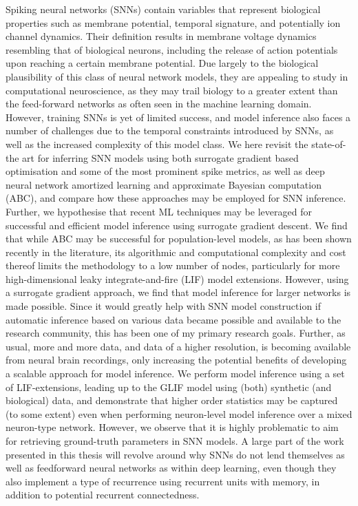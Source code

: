 \documentclass[mphil,deptreport,ai]{infthesis} %
\begin{document}
Spiking neural networks (SNNs) contain variables that represent biological properties such as membrane potential, temporal signature, and potentially ion channel dynamics. Their definition results in membrane voltage dynamics resembling that of biological neurons, including the release of action potentials upon reaching a certain membrane potential.
Due largely to the biological plausibility of this class of neural network models, they are appealing to study in computational neuroscience, as they may trail biology to a greater extent than the feed-forward networks as often seen in the machine learning domain.
However, training SNNs is yet of limited success, and model inference also faces a number of challenges due to the temporal constraints introduced by SNNs, as well as the increased complexity of this model class.
We here revisit the state-of-the art for inferring SNN models using both surrogate gradient based optimisation and some of the most prominent spike metrics, as well as deep neural network amortized learning and approximate Bayesian computation (ABC), and compare how these approaches may be employed for SNN inference. Further, we hypothesise that recent ML techniques may be leveraged for successful and efficient model inference using surrogate gradient descent.
We find that while ABC may be successful for population-level models, as has been shown recently in the literature, its algorithmic and computational complexity and cost thereof limits the methodology to a low number of nodes, particularly for more high-dimensional leaky integrate-and-fire (LIF) model extensions.
However, using a surrogate gradient approach, we find that model inference for larger networks is made possible. 
Since it would greatly help with SNN model construction if automatic inference based on various data became possible and available to the research community, this has been one of my primary research goals.
Further, as usual, more and more data, and data of a higher resolution, is becoming available from neural brain recordings, only increasing the potential benefits of developing a scalable approach for model inference.
We perform model inference using a set of LIF-extensions, leading up to the GLIF model using (both) synthetic (and biological) data, and demonstrate that higher order statistics may be captured (to some extent) even when performing neuron-level model inference over a mixed neuron-type network.
However, we observe that it is highly problematic to aim for retrieving ground-truth parameters in SNN models. A large part of the work presented in this thesis will revolve around why SNNs do not lend themselves as well as feedforward neural networks as within deep learning, even though they also implement a type of recurrence using recurrent units with memory, in addition to potential recurrent connectedness.
\end{document}
